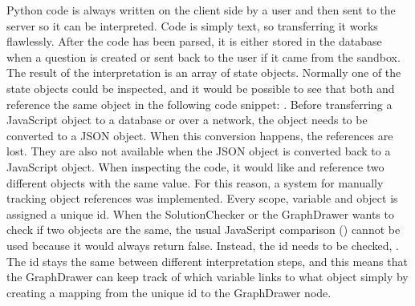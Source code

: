 Python code is always written on the client side by a user and then sent to the server so it can be interpreted. Code is simply text, so transferring it works flawlessly. After the code has been parsed, it is either stored in the database when a question is created or sent back to the user if it came from the sandbox. The result of the interpretation is an array of state objects. Normally one of the state objects could be inspected, and it would be possible to see that both  and  reference the same object in the following code snippet:
.
Before transferring a JavaScript object to a database or over a network, the object needs to be converted to a JSON object. When this conversion happens, the references are lost. They are also not available when the JSON object is converted back to a JavaScript object. When inspecting the code, it would like  and  reference two different objects with the same value. For this reason, a system for manually tracking object references was implemented. Every scope, variable and object is assigned a unique id. When the SolutionChecker or the GraphDrawer wants to check if two objects are the same, the usual JavaScript comparison () cannot be used because it would always return false. Instead, the id needs to be checked, . The id stays the same between different interpretation steps, and this means that the GraphDrawer can keep track of which variable links to what object simply by creating a mapping from the unique id to the GraphDrawer node.
